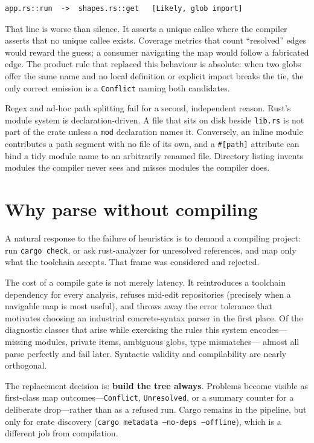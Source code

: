 \documentclass[11pt,a4paper,oneside]{report}
\begin{document}
\begin{lstlisting}[language={}]
app.rs::run  ->  shapes.rs::get   [Likely, glob import]
\end{lstlisting}

That line is worse than silence. It asserts a unique callee where the
compiler asserts that no unique callee exists. Coverage metrics that count
``resolved'' edges would reward the guess; a consumer navigating the map would
follow a fabricated edge. The product rule that replaced this behaviour is
absolute: when two globs offer the same name and no local definition or
explicit import breaks the tie, the only correct emission is a
\texttt{Conflict} naming both candidates.

Regex and ad-hoc path splitting fail for a second, independent reason. Rust's
module system is declaration-driven. A file that sits on disk beside
\texttt{lib.rs} is not part of the crate unless a \texttt{mod} declaration
names it. Conversely, an inline module contributes a path segment with no
file of its own, and a \texttt{\#[path]} attribute can bind a tidy module name
to an arbitrarily renamed file. Directory listing invents modules the compiler
never sees and misses modules the compiler does.

\section{Why parse without compiling}

A natural response to the failure of heuristics is to demand a compiling
project: run \texttt{cargo check}, or ask rust-analyzer for unresolved
references, and map only what the toolchain accepts. That frame was considered
and rejected.

The cost of a compile gate is not merely latency. It reintroduces a toolchain
dependency for every analysis, refuses mid-edit repositories (precisely when a
navigable map is most useful), and throws away the error tolerance that
motivates choosing an industrial concrete-syntax parser in the first place.
Of the diagnostic classes that arise while exercising the rules this system
encodes---missing modules, private items, ambiguous globs, type mismatches---
almost all parse perfectly and fail later. Syntactic validity and
compilability are nearly orthogonal.

The replacement decision is: \textbf{build the tree always}. Problems become
visible as first-class map outcomes---\texttt{Conflict}, \texttt{Unresolved},
or a summary counter for a deliberate drop---rather than as a refused run.
Cargo remains in the pipeline, but only for crate discovery
(\texttt{cargo metadata --no-deps --offline}), which is a different job from
compilation.
\end{document}
